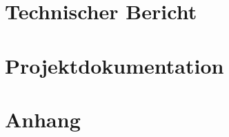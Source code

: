 \documentclass[11pt, a4paper, oneside, titlepage]{memoir}
\begin{document}
\frontmatter  %
 






\cleartorecto
\begin{KeepFromToc}
	\tableofcontents
\end{KeepFromToc}

\cleardoublepage
\printglossary[title=Glossar und Abkürzungsverzeichnis]

\cleardoublepage
\listoffigures

\cleardoublepage
\listoftables

\mainmatter  %

\part{Technischer Bericht}


\part{Projektdokumentation}






\part{Anhang}
\appendix



















\backmatter

\cleardoublepage
\printbibliography[title={Literaturverzeichnis}]


\end{document}
